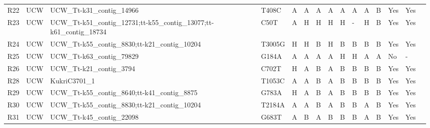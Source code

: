 \begin{sidewaystable}
\begin{localsize}{6}{9}
\begin{tabular}{llllllll|lllllll}
 R22        & UCW         & UCW\_Tt-k31\_contig\_14966                                         & T408C  & A      & A         & A        & A        & A            & A         & A         & B     & Yes           & Yes                    &                         \\
 R23        & UCW         & UCW\_Tt-k51\_contig\_12731;tt-k55\_contig\_13077;tt-k61\_contig\_18734 & C50T   & A      & H         & H        & H        & H            & -         & H         & B     & Yes           & Yes                    &                         \\
 R24        & UCW         & UCW\_Tt-k55\_contig\_8830;tt-k21\_contig\_10204                      & T3005G & H      & H         & B        & H        & B            & B         & B         & B     & Yes           & Yes                    &                         \\
 R25        & UCW         & UCW\_Tt-k63\_contig\_79829                                         & G184A  & A      & A         & A        & A        & H            & H         & A         & A     & No            & -                      &                         \\
 R26        & UCW         & UCW\_Tt-k21\_contig\_3794                                          & C702T  & H      & A         & B        & A        & B            & B         & B         & B     & Yes           & Yes                    &                         \\
 R28        & UCW         & KukriC3701\_1                                                    & T1053C & A      & A         & B        & A        & B            & B         & B         & B     & Yes           & Yes                    &                         \\
 R29        & UCW         & UCW\_Tt-k55\_contig\_8640;tt-k41\_contig\_8875                       & G783A  & H      & A         & B        & A        & B            & B         & B         & B     & Yes           & Yes                    &                         \\
 R30        & UCW         & UCW\_Tt-k55\_contig\_8830;tt-k21\_contig\_10204                      & T2184A & A      & A         & B        & A        & B            & B         & A         & B     & Yes           & Yes                    &                         \\
 R31        & UCW         & UCW\_Tt-k45\_contig\_22098                                         & G683T  & A      & B         & A        & B        & B            & B         & A         & B     & Yes           & Yes                    &                         \\

\end{tabular}
\end{localsize}
\end{sidewaystable}
